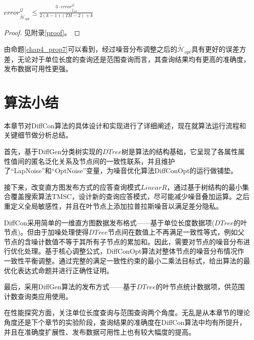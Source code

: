 \begin{prop}
	\label{chap4_prop7}
	$error_{\tilde{\mathcal{H}}_{opt}}^{\mathcal{Q}} \leqslant \frac{3 \cdotp error_{\tilde{L}_{all}}^{\mathcal{Q}}}{2(k-1)(TH-2)+k}$
\end{prop}
\begin{proof}
	见附录\ref{proof}。
\end{proof}

由命题\ref{chap4_prop7}可以看到，经过噪音分布调整之后的$\tilde{\mathcal{H}}_{opt}$具有更好的误差方差，无论对于单位长度的查询还是范围查询而言，其查询结果均有更高的准确度，发布数据可用性更强。

\section{算法小结}

本章节对DiffCon算法的具体设计和实现进行了详细阐述，现在就算法运行流程和关键细节做分析总结。

首先，基于DiffGen分类树实现的$DTree$树是算法的结构基础，它呈现了各属性属性值间的匿名泛化关系及节点间的一致性联系，并且维护了“LapNoise”和“OptNoise”变量，为噪音优化算法DiffConOpt的运行做铺垫。

接下来，改变直方图发布方式的应答查询模式$LinearR$，通过基于树结构的最小集合覆盖搜索算法TMSC，设计新的查询应答模式，尽可能减少噪音叠加运算。之后重定义全局敏感性，并且在叶节点上添加拉普拉斯噪音以满足差分隐私。

DiffCon采用简单的一维直方图数据发布格式——基于单位长度数据项($DTree$的叶节点)。但由于加噪处理使得$DTree$节点间在数值上不再满足一致性等式，例如父节点的含噪计数值不等于其所有子节点的累加和。因此，需要对节点的噪音分布进行优化处理。基于核心调整公式，DiffConOpt算法对整体节点的噪音分布情况作一致性平衡调整。通过完整的满足一致性约束的最小二乘法目标式，给出算法的最优化表达式命题并进行正确性证明。

最后，采用DiffGen算法的发布方式——基于$DTree$的叶节点统计数据项，供范围计数查询类应用使用。

在性能探究方面，关注单位长度查询与范围查询两个角度。无乱是从本章节的理论角度还是下个章节的实验阶段，查询结果的准确度在DiffCon算法中均有所提升，并且在准确度扩展性、发布数据可用性上也有较大幅度的提高。


